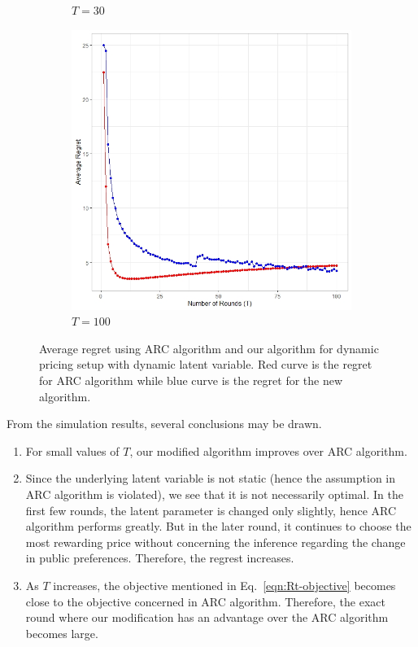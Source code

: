 \documentclass[11pt]{article}
\begin{document}
\begin{figure}[ht]
\begin{subfigure}{0.33\textwidth}
        \caption{$T = 30$}
    \end{subfigure}
    \begin{subfigure}{0.33\textwidth}
        \centering
        \includegraphics[width = \textwidth]{figT100.jpeg}
        \caption{$T = 100$}
    \end{subfigure}
    \caption{Average regret using ARC algorithm and our algorithm for dynamic pricing setup with dynamic latent variable. Red curve is the regret for ARC algorithm while blue curve is the regret for the new algorithm.}
    \label{fig:mainplot}
\end{figure}

From the simulation results, several conclusions may be drawn.

\begin{enumerate}
    \item For small values of $T$, our modified algorithm improves over ARC algorithm. 
    \item Since the underlying latent variable is not static (hence the assumption in ARC algorithm is violated), we see that it is not necessarily optimal. In the first few rounds, the latent parameter is changed only slightly, hence ARC algorithm performs greatly. But in the later round, it continues to choose the most rewarding price without concerning the inference regarding the change in public preferences. Therefore, the regrest increases.
    \item As $T$ increases, the objective mentioned in Eq.~\eqref{eqn:Rt-objective} becomes close to the objective concerned in ARC algorithm. Therefore, the exact round where our modification has an advantage over the ARC algorithm becomes large.
\end{enumerate}
\end{document}
